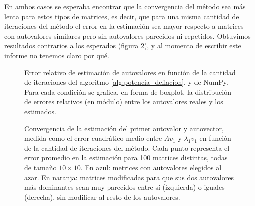 \documentclass{article}
\begin{document}
En ambos casos se esperaba encontrar que la convergencia del método sea más lenta para estos tipos de matrices, es decir, que para una misma cantidad de iteraciones del método el error en la estimación sea mayor respecto a matrices con autovalores similares pero sin autovalores parecidos ni repetidos. Obtuvimos resultados contrarios a los esperados (figura \ref{fig:convergencia_patologica}), y al momento de escribir este informe no tenemos claro por qué.


\begin{figure}[!ht]
    \centering
        
    \caption{
    Error relativo de estimación de autovalores en función de la cantidad de iteraciones del algoritmo \ref{alg:potencia_deflacion}, y de NumPy. Para cada condición se grafica, en forma de boxplot, la distribución de errores relativos (en módulo) entre los autovalores reales y los estimados.
    } 
    \label{fig:convergencia_iguales}
\end{figure}

\begin{figure}[!ht]
    \centering
        
        
    \caption{
        Convergencia de la estimación del primer autovalor y autovector, medida como el error cuadrático medio entre $Av_1$ y $\lambda_1v_1$ en función de la cantidad de iteraciones del método. Cada punto representa el error promedio en la estimación para 100 matrices distintas, todas de tamaño $10 \times 10$. En azul: metrices con autovalores elegidos al azar. En naranja: matrices modificadas para que sus dos autovalores más dominantes sean muy parecidos entre sí (izquierda) o iguales (derecha), sin modificar al resto de los autovalores.
    } 
    \label{fig:convergencia_patologica}
\end{figure}


\end{document}

